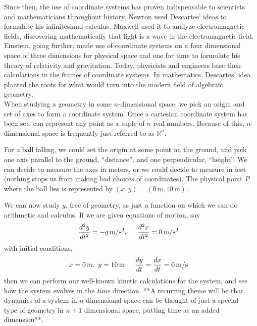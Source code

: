 \documentclass[../master.tex]{subfiles}
\begin{document}
	Since then, the use of coordinate systems has proven indispensable to scientists and mathematicians throughout history. Newton used Descartes' ideas to formulate his infinitesimal calculus. Maxwell used it to analyze electromagnetic fields, discovering mathematically that light is a wave in the electromagnetic field. Einstein, going further, made use of coordinate systems on a four dimensional space of three dimensions for physical space and one for time to formulate his theory of relativity and gravitation. Today, physicists and engineers base their calculations in the frames of coordinate systems. In mathematics, Descartes' idea planted the roots for what would turn into the modern field of algebraic geometry. \\
	
	When studying a geometry in some $n$-dimensional space, we pick an origin and set of axes to form a coordinate system. Once a cartesian coordinate system has been set, can represent any point as a tuple of $n$ real numbers. Because of this, $n$-dimensional space is frequently just referred to as $\mathbb{R}^n$.


	
	For a ball falling, we could set the origin at some point on the ground, and pick one axis parallel to the ground, ``distance'', and one perpendicular, ``height''. We can decide to measure the axes in meters, or we could decide to measure in feet (nothing stops us from making bad choices of coordinates). The physical point $P$ where the ball lies is represented by $(x,y)=(0\, \mathrm m,10\, \mathrm m)$. %
	
	
	We can now study $y$, free of geometry, as just a function on which we can do arithmetic and calculus. If we are given equations of motion, say 
	\begin{equation*}
		\frac{d^2y}{dt^2} = -g \, \mathrm{m/s^2}, \hspace{5mm} \frac{d^2x}{dt^2} = 0 \, \mathrm{m/s^2}
	\end{equation*} 
	with initial conditions,
	\begin{equation*}
		x = 0 \,\mathrm m,~ y = 10 \,\mathrm m \hspace{5mm} \frac{dy}{dt} = \frac{dx}{dt}=0 \, \mathrm{m/s}
	\end{equation*}
	 then we can perform our well-known kinetic calculations for the system, and see how the system evolves in the \emph{time} direction. **A recurring theme will be that dynamics of a system in $n$-dimensional space can be thought of just a special type of geometry in $n+1$ dimensional space, putting time as an added dimension**.\\
	
\end{document}

